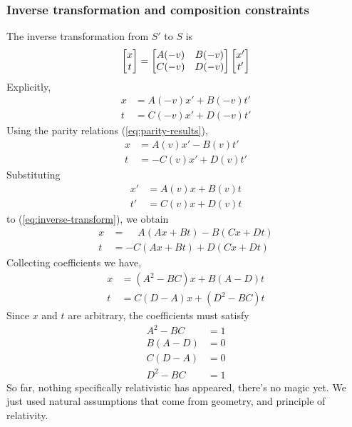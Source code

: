 	\subsubsection{Inverse transformation and composition constraints}
		The inverse transformation from $S'$ to $S$ is
		\begin{equation}
		    \bmqty{
		    	x\\t
		    }
			=
			\bmqty{
				A(-v) & B(-v)\\
				C(-v) & D(-v)
			}
			\bmqty{
				x'\\t'
			}
		\end{equation}
		Explicitly,
		\begin{equation}
			\begin{aligned}
				x &= A(-v)x'+B(-v)t' \\
				t &= C(-v)x'+D(-v)t'
			\end{aligned}
			\label{eq:inverse-transform}
		\end{equation}
		Using the parity relations (\ref{eq:parity-results}),
		\begin{align*}
			x &= A(v)x'-B(v)t' \\
			t &= -C(v)x'+D(v)t'
		\end{align*}
		Substituting
		\begin{align*}
			x' &= A(v)x+B(v)t \\
			t' &= C(v)x+D(v)t
		\end{align*}
		to (\ref{eq:inverse-transform}), we obtain
		\begin{align*}
			x &= \phantom{-}A(Ax+Bt)-B(Cx+Dt) \\
			t &= -C(Ax+Bt)+D(Cx+Dt)
		\end{align*}
		Collecting coefficients we have,
		\begin{align*}
			x &= (A^2-BC)x + B(A-D)t \\
			t &= C(D-A)x + (D^2-BC)t
		\end{align*}
		Since $x$ and $t$ are arbitrary, the coefficients must satisfy
		\begin{equation}
		    \begin{aligned}
				A^2-BC&=1 \\
				B(A-D)&=0 \\
				C(D-A)&=0 \\
				D^2-BC&=1
		    \end{aligned}
			\label{eq:coefficient-conditions}
		\end{equation}
		So far, nothing specifically relativistic has appeared, there's no magic yet.
		We just used natural assumptions that come from geometry, and principle of relativity. 
